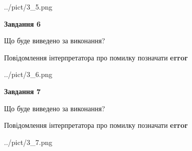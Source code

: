 \documentclass[10pt, ukrainian]{article}
\begin{document}
{\begin {large}
\begin{center}
	{../pict/3_5.png}
\end{center}
\newpage

{\begin {center}\textbf{Завдання 6}\end {center}}\par
Що буде виведено за виконання? \par
Повідомлення інтерпретатора про помилку позначати \textbf{error}

\begin{center}
	{../pict/3_6.png}
\end{center}
\newpage

{\begin {center}\textbf{Завдання 7}\end {center}}\par
Що буде виведено за виконання? \par
Повідомлення інтерпретатора про помилку позначати \textbf{error}

\begin{center}
	{../pict/3_7.png}
\end{center}
\newpage

\end {large}}
\end{document}
